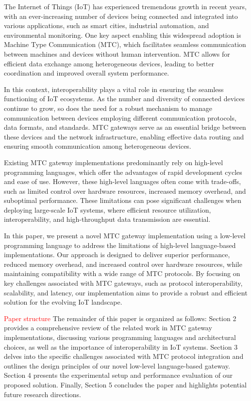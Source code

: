 \documentclass[a4paper,fleqn]{cas-dc}
\begin{document}
The Internet of Things (IoT) has experienced tremendous growth in recent years, with an ever-increasing number of devices being connected and integrated into various applications, such as smart cities, industrial automation, and environmental monitoring. One key aspect enabling this widespread adoption is Machine Type Communication (MTC), which facilitates seamless communication between machines and devices without human intervention. MTC allows for efficient data exchange among heterogeneous devices, leading to better coordination and improved overall system performance.

In this context, interoperability plays a vital role in ensuring the seamless functioning of IoT ecosystems. As the number and diversity of connected devices continue to grow, so does the need for a robust mechanism to manage communication between devices employing different communication protocols, data formats, and standards. MTC gateways serve as an essential bridge between these devices and the network infrastructure, enabling effective data routing and ensuring smooth communication among heterogeneous devices.

Existing MTC gateway implementations predominantly rely on high-level programming languages, which offer the advantages of rapid development cycles and ease of use. However, these high-level languages often come with trade-offs, such as limited control over hardware resources, increased memory overhead, and suboptimal performance. These limitations can pose significant challenges when deploying large-scale IoT systems, where efficient resource utilization, interoperability, and high-throughput data transmission are essential.

In this paper, we present a novel MTC gateway implementation using a low-level programming language to address the limitations of high-level language-based implementations. Our approach is designed to deliver superior performance, reduced memory overhead, and increased control over hardware resources, while maintaining compatibility with a wide range of MTC protocols. By focusing on key challenges associated with MTC gateways, such as protocol interoperability, scalability, and latency, our implementation aims to provide a robust and efficient solution for the evolving IoT landscape.

\textcolor{red}{Paper structure}
The remainder of this paper is organized as follows: Section 2 provides a comprehensive review of the related work in MTC gateway implementations, discussing various programming languages and architectural choices, as well as the importance of interoperability in IoT systems. Section 3 delves into the specific challenges associated with MTC protocol integration and outlines the design principles of our novel low-level language-based gateway. Section 4 presents the experimental setup and performance evaluation of our proposed solution. Finally, Section 5 concludes the paper and highlights potential future research directions.
\end{document}
